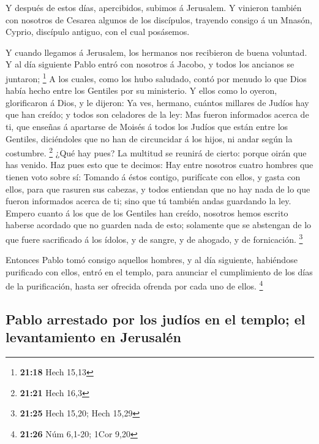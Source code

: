 Y después de estos días, apercibidos, subimos á Jerusalem.
 Y vinieron también con nosotros de Cesarea algunos de los
discípulos, trayendo consigo á un Mnasón, Cyprio, discípulo antiguo, con
el cual posásemos.

 Y cuando llegamos á Jerusalem, los hermanos nos recibieron
de buena voluntad.  Y al día siguiente Pablo entró con
nosotros á Jacobo, y todos los ancianos se juntaron; \footnote{\textbf{21:18}
  Hech 15,13}  A los cuales, como los hubo saludado, contó
por menudo lo que Dios había hecho entre los Gentiles por su ministerio.
 Y ellos como lo oyeron, glorificaron á Dios, y le dijeron:
Ya ves, hermano, cuántos millares de Judíos hay que han creído; y todos
son celadores de la ley:  Mas fueron informados acerca de
ti, que enseñas á apartarse de Moisés á todos los Judíos que están entre
los Gentiles, diciéndoles que no han de circuncidar á los hijos, ni
andar según la costumbre. \footnote{\textbf{21:21} Hech 16,3}
 ¿Qué hay pues? La multitud se reunirá de cierto: porque
oirán que has venido.  Haz pues esto que te decimos: Hay
entre nosotros cuatro hombres que tienen voto sobre sí: 
Tomando á éstos contigo, purifícate con ellos, y gasta con ellos, para
que rasuren sus cabezas, y todos entiendan que no hay nada de lo que
fueron informados acerca de ti; sino que tú también andas guardando la
ley.  Empero cuanto á los que de los Gentiles han creído,
nosotros hemos escrito haberse acordado que no guarden nada de esto;
solamente que se abstengan de lo que fuere sacrificado á los ídolos, y
de sangre, y de ahogado, y de fornicación. \footnote{\textbf{21:25} Hech
  15,20; Hech 15,29}

 Entonces Pablo tomó consigo aquellos hombres, y al día
siguiente, habiéndose purificado con ellos, entró en el templo, para
anunciar el cumplimiento de los días de la purificación, hasta ser
ofrecida ofrenda por cada uno de ellos. \footnote{\textbf{21:26} Núm
  6,1-20; 1Cor 9,20}

\hypertarget{pablo-arrestado-por-los-juduxedos-en-el-templo-el-levantamiento-en-jerusaluxe9n}{%
\subsection{Pablo arrestado por los judíos en el templo; el
levantamiento en
Jerusalén}\label{pablo-arrestado-por-los-juduxedos-en-el-templo-el-levantamiento-en-jerusaluxe9n}}

